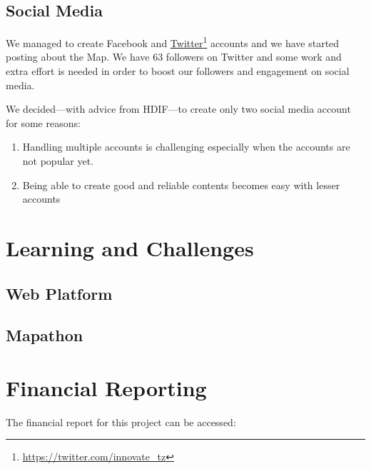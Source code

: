 \documentclass[a4paper,12pt,twoside]{article}
\begin{document}
\subsection{Social Media}
We managed to create Facebook and \href{https://twitter.com/innovate_tz}{Twitter}\footnote{\url{https://twitter.com/innovate_tz}} accounts and we have started posting about the Map. We have 63 followers on Twitter and some work and extra effort is needed in order to boost our followers and engagement on social media. 

We decided---with advice from HDIF---to create only two social media account for some reasons:

\begin{enumerate}
	\item Handling multiple accounts is challenging especially when the accounts are not popular yet.
	\item Being able to create good and reliable contents becomes easy with lesser accounts
\end{enumerate}

\section{Learning and Challenges}
\subsection{Web Platform}
\subsection{Mapathon}

\section{Financial Reporting}
The financial report for this project can be accessed:
\end{document}
